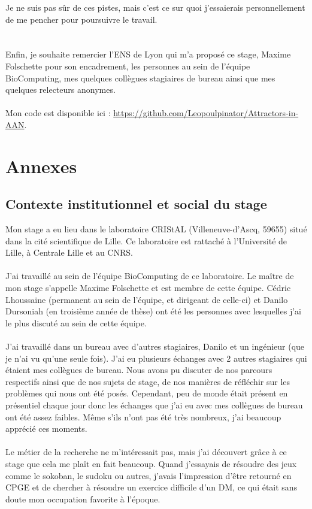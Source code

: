 \documentclass[10pt,a4paper]{article}
\begin{document}
Je ne suis pas sûr de ces pistes, mais c'est ce sur quoi j'essaierais personnellement de me pencher pour poursuivre le travail.\\ \\ \\
Enfin, je souhaite remercier l'ENS de Lyon qui m'a proposé ce stage, Maxime Folschette pour son encadrement, les personnes au sein de l'équipe BioComputing, mes quelques collègues stagiaires de bureau ainsi que mes quelques 
relecteurs anonymes.\\ \\
Mon code est disponible ici : \href{https://github.com/Leopoulpinator/Attractors-in-AAN}{https://github.com/Leopoulpinator/Attractors-in-AAN}.

\newpage


\newpage
\section{Annexes}
\subsection{Contexte institutionnel et social du stage}
Mon stage a eu lieu dans le laboratoire CRIStAL (Villeneuve-d'Ascq, 59655) situé dans la cité scientifique de Lille. Ce laboratoire est rattaché à l’Université de Lille, à Centrale Lille et au CNRS.\\ \\
J'ai travaillé au sein de l'équipe BioComputing de ce laboratoire. Le maître de mon stage s'appelle Maxime Folschette et est membre de cette équipe. Cédric Lhoussaine (permanent au sein de l'équipe, et dirigeant de celle-ci) et 
Danilo Dursoniah (en troisième année de thèse) ont été les personnes avec lesquelles j'ai le plus discuté au sein de cette équipe.\\ \\
J'ai travaillé dans un bureau avec d'autres stagiaires, Danilo et un ingénieur (que je n'ai vu qu'une seule fois). J'ai eu plusieurs échanges avec 2 autres stagiaires qui étaient mes collègues de bureau. Nous avons pu discuter de 
nos parcours respectifs ainsi que de nos sujets de stage, de nos manières de réfléchir sur les problèmes qui nous ont été posés. Cependant, peu de monde était présent en présentiel chaque jour donc les échanges que j'ai eu avec mes 
collègues de bureau ont été assez faibles. Même s'ils n'ont pas été très nombreux, j'ai beaucoup apprécié ces moments.\\ \\
Le métier de la recherche ne m'intéressait pas, mais j'ai découvert grâce à ce stage que cela me plaît en fait beaucoup. Quand j'essayais de résoudre des jeux comme le sokoban, le sudoku ou autres, j'avais l'impression d'être 
retourné en CPGE et de chercher à résoudre un exercice difficile d'un DM, ce qui était sans doute mon occupation favorite à l'époque.\\ \\ \\
\end{document}
